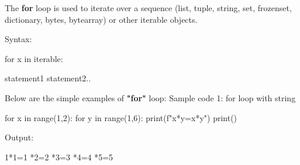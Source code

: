 \setlength{\columnsep}{3pt}

\begin{flushleft}

	
	The \textbf{for} loop is used to iterate over a sequence (list, tuple, string, set, frozenset, dictionary, bytes, bytearray) or
other iterable objects.

	
	\begin{tcolorbox}[breakable,notitle,boxrule=1pt,colback=pink,colframe=pink]

		\color{black}

		\font=8pt

		Syntax: 

		\newline

		for x in iterable:

		\newline

		\hphantom{} \hphantom{}  statement1 \newline
		\hphantom{} \hphantom{}  statement2..

		\font=4pt

	\end{tcolorbox}

	Below are the simple examples of \textbf{"for"} loop:
	\newline
	Sample code 1:
for loop with string

	\begin{tcolorbox}[breakable,notitle,boxrule=-0pt,colback=code,colframe=code]

		\color{white}

		\font=8pt

		for x in range(1,2):  \newline
		\hphantom{} \hphantom{}	for y in range(1,6): \newline
		\hphantom{} \hphantom{}	\hphantom{} \hphantom{}	print(f"{x}*{y}={x*y}")  \newline
		\hphantom{} \hphantom{}	print()

		\font=4pt

	\end{tcolorbox}

	
	Output:

	\begin{tcolorbox}[breakable,notitle,boxrule=-0pt,colback=output,colframe=output]

		\color{black}

		1*1=1 *2=2 *3=3 *4=4 *5=5
		\font=4pt

	\end{tcolorbox}

	
\end{flushleft}


\newpage


